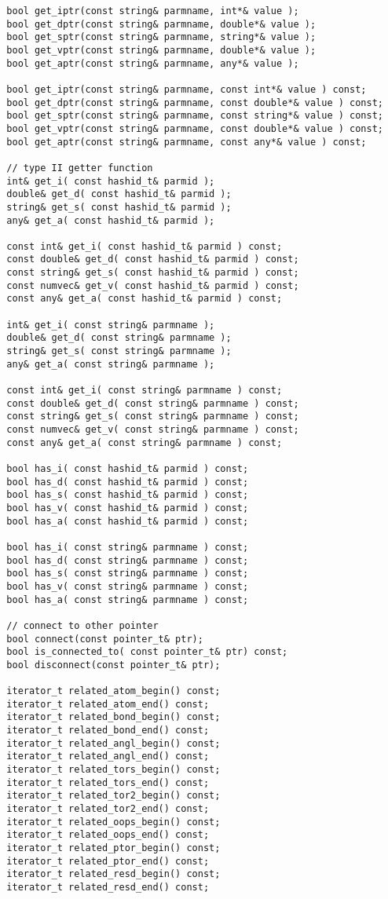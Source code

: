 \documentclass[letterpaper]{book}
\begin{document}
\begin{lstlisting}
  bool get_iptr(const string& parmname, int*& value ); 
  bool get_dptr(const string& parmname, double*& value );
  bool get_sptr(const string& parmname, string*& value );
  bool get_vptr(const string& parmname, double*& value );
  bool get_aptr(const string& parmname, any*& value );

  bool get_iptr(const string& parmname, const int*& value ) const; 
  bool get_dptr(const string& parmname, const double*& value ) const;
  bool get_sptr(const string& parmname, const string*& value ) const;
  bool get_vptr(const string& parmname, const double*& value ) const;
  bool get_aptr(const string& parmname, const any*& value ) const;

  // type II getter function
  int& get_i( const hashid_t& parmid );
  double& get_d( const hashid_t& parmid );
  string& get_s( const hashid_t& parmid );
  any& get_a( const hashid_t& parmid );

  const int& get_i( const hashid_t& parmid ) const;
  const double& get_d( const hashid_t& parmid ) const;
  const string& get_s( const hashid_t& parmid ) const;
  const numvec& get_v( const hashid_t& parmid ) const;
  const any& get_a( const hashid_t& parmid ) const;

  int& get_i( const string& parmname );
  double& get_d( const string& parmname );
  string& get_s( const string& parmname );
  any& get_a( const string& parmname );

  const int& get_i( const string& parmname ) const;
  const double& get_d( const string& parmname ) const;
  const string& get_s( const string& parmname ) const;
  const numvec& get_v( const string& parmname ) const;
  const any& get_a( const string& parmname ) const;

  bool has_i( const hashid_t& parmid ) const;
  bool has_d( const hashid_t& parmid ) const;
  bool has_s( const hashid_t& parmid ) const;
  bool has_v( const hashid_t& parmid ) const;
  bool has_a( const hashid_t& parmid ) const;

  bool has_i( const string& parmname ) const;
  bool has_d( const string& parmname ) const;
  bool has_s( const string& parmname ) const;
  bool has_v( const string& parmname ) const;
  bool has_a( const string& parmname ) const;

  // connect to other pointer
  bool connect(const pointer_t& ptr);
  bool is_connected_to( const pointer_t& ptr) const;
  bool disconnect(const pointer_t& ptr);

  iterator_t related_atom_begin() const;
  iterator_t related_atom_end() const;
  iterator_t related_bond_begin() const;
  iterator_t related_bond_end() const;
  iterator_t related_angl_begin() const;
  iterator_t related_angl_end() const;
  iterator_t related_tors_begin() const;
  iterator_t related_tors_end() const;
  iterator_t related_tor2_begin() const;
  iterator_t related_tor2_end() const;
  iterator_t related_oops_begin() const;
  iterator_t related_oops_end() const;
  iterator_t related_ptor_begin() const;
  iterator_t related_ptor_end() const;
  iterator_t related_resd_begin() const;
  iterator_t related_resd_end() const;


\end{lstlisting}
\end{document}
